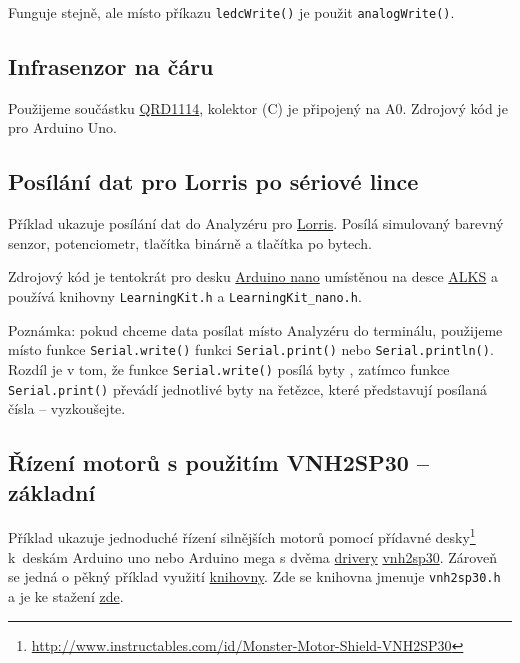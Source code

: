 
 
Funguje stejně, ale místo příkazu {\tt ledcWrite()} je použit {\tt analogWrite()}.

\subsection{Infrasenzor na čáru} \label{prog:qrd1114}

Použijeme součástku \hyperref[qrd1114]{QRD1114}, kolektor (C) je připojený na A0. Zdrojový kód je pro Arduino Uno. 



\subsection{Posílání dat pro Lorris po sériové lince} \label{prog:lorris}

Příklad ukazuje posílání dat do Analyzéru pro \hyperref[lorris]{Lorris}.
 Posílá simulovaný barevný senzor, potenciometr, tlačítka binárně a tlačítka po bytech. 

Zdrojový kód je tentokrát pro desku \hyperref[alks:nano]{Arduino nano}
 umístěnou na desce \hyperref[alks]{ALKS} a používá knihovny
{\tt LearningKit.h}  a  {\tt LearningKit\_nano.h}. 

Poznámka: pokud chceme data posílat místo Analyzéru do terminálu, použijeme místo funkce {\tt Serial.write()}
funkci {\tt Serial.print()} nebo {\tt Serial.println()}. Rozdíl je v tom, že funkce {\tt Serial.write()} posílá byty , zatímco funkce {\tt Serial.print()} převádí jednotlivé byty na řetězce, které představují posílaná čísla -- vyzkoušejte.   



\label{prog:vnh2sp30} \label{prog:knihovna} 
\subsection{Řízení motorů s použitím VNH2SP30 -- základní} 

Příklad ukazuje jednoduché řízení silnějších motorů pomocí přídavné 
desky\footnote{\url{http://www.instructables.com/id/Monster-Motor-Shield-VNH2SP30}
	} k~deskám Arduino uno nebo Arduino mega  s dvěma \hyperref[driver]{drivery}
  \hyperref[vnh2sp30]{vnh2sp30}.  Zároveň se jedná o pěkný příklad využití \hyperref[knihovna]{knihovny}. Zde se knihovna jmenuje {\tt vnh2sp30.h} a je ke stažení 
  \href{https://github.com/RoboticsBrno/RoboticsBrno-guides/tree/RoboticsManual/RoboticsManual/priklady_c}{zde}.






